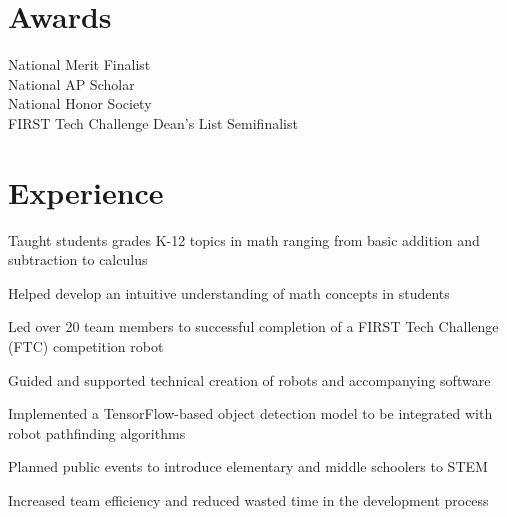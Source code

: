\documentclass[]{deedy-resume}
\begin{document}
\begin{minipage}[t]{0.33\textwidth}
\section{Awards}
National Merit Finalist \\
National AP Scholar \\
National Honor Society \\
FIRST Tech Challenge Dean's List Semifinalist \\
\sectionsep

%
%

\end{minipage} 
\hfill
\begin{minipage}[t]{0.66\textwidth} 


\section{Experience}
\vspace{\topsep} %
\begin{tightemize}
\item Taught students grades K-12 topics in math ranging from basic addition and subtraction to calculus
\item Helped develop an intuitive understanding of math concepts in students
\end{tightemize}
\sectionsep

\begin{tightemize}
\item Led over 20 team members to successful completion of a FIRST Tech Challenge (FTC) competition robot
\item Guided and supported technical creation of robots and accompanying software
\item Implemented a TensorFlow-based object detection model to be integrated with robot pathfinding algorithms
\item Planned public events to introduce elementary and middle schoolers to STEM
\item Increased team efficiency and reduced wasted time in the development process
\end{tightemize}
\sectionsep


\end{minipage}
\end{document}
